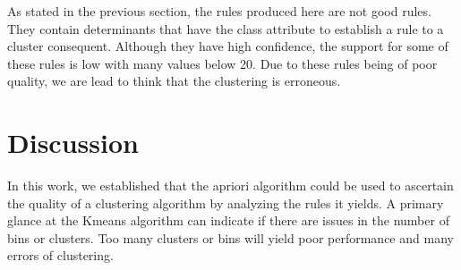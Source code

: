 \documentclass[letterpaper,12pt]{article}
\begin{document}
As stated in the previous section, the rules produced here are not good rules. They contain determinants that have the class attribute to establish a rule to a cluster consequent. Although they have high confidence, the support for some of these rules is low with many values below 20. Due to these rules being of poor quality, we are lead to think that the clustering is erroneous.


\section{Discussion}

In this work, we established that the apriori algorithm could be used to ascertain the quality of a clustering algorithm by analyzing the rules it yields. A primary glance at the Kmeans algorithm can indicate if there are issues in the number of bins or clusters. Too many clusters or bins will yield poor performance and many errors of clustering.
\end{document}
